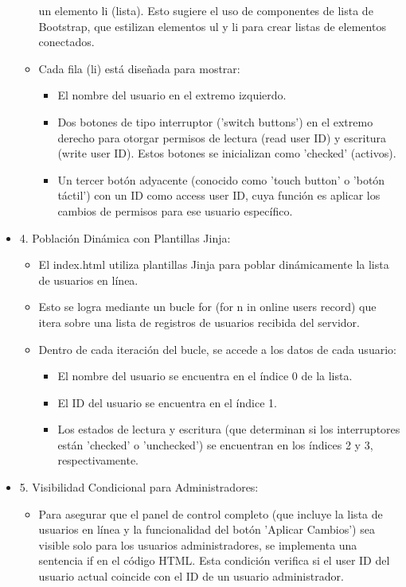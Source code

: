 \documentclass{report}
\begin{document}
\begin{itemize}
\begin{itemize}
            un elemento li (lista). Esto sugiere el uso de componentes de lista de Bootstrap, que estilizan elementos ul y li para crear 
            listas de elementos conectados.
            \item Cada fila (li) está diseñada para mostrar:
                \begin{itemize}
                    \item El nombre del usuario en el extremo izquierdo.
                    \item Dos botones de tipo interruptor ('switch buttons') en el extremo derecho para otorgar permisos de lectura (read user ID) 
                    y escritura (write user ID). Estos botones se inicializan como 'checked' (activos).
                    \item Un tercer botón adyacente (conocido como 'touch button' o 'botón táctil') con un ID como access user ID, cuya función 
                    es aplicar los cambios de permisos para ese usuario específico.
                \end{itemize}
        \end{itemize}
    \item 4. Población Dinámica con Plantillas Jinja:
        \begin{itemize}
            \item El index.html utiliza plantillas Jinja para poblar dinámicamente la lista de usuarios en línea.
            \item Esto se logra mediante un bucle for (for n in online users record) que itera sobre una lista de registros de usuarios 
            recibida del servidor.
            \item Dentro de cada iteración del bucle, se accede a los datos de cada usuario:
                \begin{itemize}
                    \item El nombre del usuario se encuentra en el índice 0 de la lista.
                    \item El ID del usuario se encuentra en el índice 1.
                    \item Los estados de lectura y escritura (que determinan si los interruptores están 'checked' o 'unchecked') 
                    se encuentran en los índices 2 y 3, respectivamente.
                \end{itemize}
        \end{itemize}
    \item 5. Visibilidad Condicional para Administradores:
        \begin{itemize}
            \item Para asegurar que el panel de control completo (que incluye la lista de usuarios en línea y la funcionalidad del 
            botón 'Aplicar Cambios') sea visible solo para los usuarios administradores, se implementa una sentencia if en el código HTML. 
            Esta condición verifica si el user ID del usuario actual coincide con el ID de un usuario administrador.
        \end{itemize}
\end{itemize}
\end{document}
